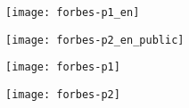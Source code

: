 
\texttt{[image: forbes-p1\_en]}
\WillContinue
\pagebreak

\Continuing
\texttt{[image: forbes-p2\_en\_public]}
\pagebreak

\texttt{[image: forbes-p1]}
\WillContinue
\pagebreak

\Continuing
\texttt{[image: forbes-p2]}

\pagebreak
